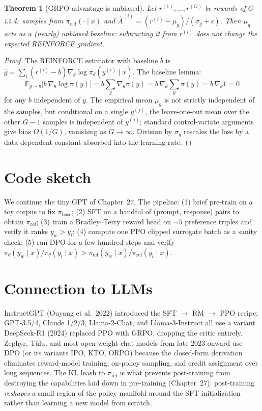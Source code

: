 \documentclass[11pt]{article}
\newtheorem{theorem}{Theorem}[section]
\theoremstyle{remark}
\begin{document}
\begin{theorem}[GRPO advantage is unbiased]
Let $r^{(1)},\dots,r^{(G)}$ be rewards of $G$ i.i.d.\ samples from $\pi_{\mathrm{old}}(\cdot\mid x)$ and $\hat A^{(i)}=(r^{(i)}-\mu_g)/(\sigma_g+\epsilon)$. Then $\mu_g$ acts as a (nearly) unbiased baseline: subtracting it from $r^{(i)}$ does not change the expected REINFORCE gradient.
\end{theorem}

\begin{proof}
The REINFORCE estimator with baseline $b$ is $\hat g=\sum_i(r^{(i)}-b)\nabla_\theta\log\pi_\theta(y^{(i)}\mid x)$. The baseline lemma:
\[
\mathbb{E}_{y\sim\pi}\!\big[b\,\nabla_\theta\log\pi(y)\big]
= b\sum_y\nabla_\theta\pi(y)
= b\,\nabla_\theta\!\sum_y\pi(y)
= b\,\nabla_\theta 1 = 0
\]
for any $b$ independent of $y$. The empirical mean $\mu_g$ is not strictly independent of the samples, but conditional on a single $y^{(j)}$, the leave-one-out mean over the other $G-1$ samples is independent of $y^{(j)}$; standard control-variate arguments give bias $O(1/G)$, vanishing as $G\to\infty$. Division by $\sigma_g$ rescales the loss by a data-dependent constant absorbed into the learning rate.
\end{proof}

\section*{Code sketch}

We continue the tiny GPT of Chapter~27. The pipeline: (1) brief pre-train on a toy corpus to fix $\pi_{\mathrm{base}}$; (2) SFT on a handful of (prompt, response) pairs to obtain $\pi_{\mathrm{ref}}$; (3) train a Bradley--Terry reward head on $\sim 5$ preference triples and verify it ranks $y_w > y_l$; (4) compute one PPO clipped surrogate batch as a sanity check; (5) run DPO for a few hundred steps and verify $\pi_\theta(y_w\mid x)/\pi_\theta(y_l\mid x) > \pi_{\mathrm{ref}}(y_w\mid x)/\pi_{\mathrm{ref}}(y_l\mid x)$.

\section*{Connection to LLMs}

InstructGPT (Ouyang et al.\ 2022) introduced the SFT $\to$ RM $\to$ PPO recipe; GPT-3.5/4, Claude 1/2/3, Llama-2-Chat, and Llama-3-Instruct all use a variant. DeepSeek-R1 (2024) replaced PPO with GRPO, dropping the critic entirely. Zephyr, T\"ulu, and most open-weight chat models from late 2023 onward use DPO (or its variants IPO, KTO, ORPO) because the closed-form derivation eliminates reward-model training, on-policy sampling, and credit assignment over long sequences. The KL leash to $\pi_{\mathrm{ref}}$ is what prevents post-training from destroying the capabilities laid down in pre-training (Chapter~27): post-training \emph{reshapes} a small region of the policy manifold around the SFT initialization rather than learning a new model from scratch.
\end{document}
